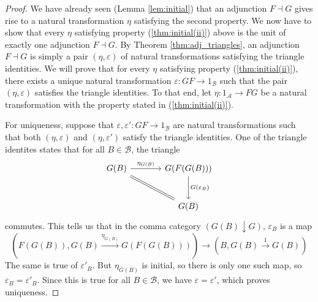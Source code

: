 \documentclass[10pt,oneside]{book}
\def\~#1{\mathscr{#1}}
\def\To#1{\xrightarrow{#1}}
\newcommand{\ve}{\varepsilon}
\theoremstyle{plain}
\theoremstyle{definition}
\theoremstyle{remark}
\numberwithin{equation}{section}
\numberwithin{figure}{section}
\begin{document}
\begin{proof}
    We have already seen (Lemma \ref{lem:initial}) that an adjunction $F \dashv G$ gives rise to a natural transformation $\eta$ satisfying the second property. We now have to show that every $\eta$ satisfying property (\ref{thm:initial(ii)}) above is the unit of exactly one adjunction $F \dashv G$. By Theorem \ref{thm:adj_triangles}, an adjunction $F \dashv G$ is simply a pair $(\eta, \ve)$ of natural transformations satisfying the triangle identities. We will prove that for every $\eta$ satisfying property (\ref{thm:initial(ii)}), there exists a unique natural transformation $\ve: GF \to 1_{\~B}$ such that the pair $(\eta, \ve)$ satisfies the triangle identities. To that end, let $\eta: 1_{\~A} \to FG$ be a natural transformation with the property stated in (\ref{thm:initial(ii)}).

    For uniqueness, suppose that $\ve, \ve': GF \to 1_{\~B}$ are natural transformations such that both $(\eta, \ve)$ and $(\eta, \ve')$ satisfy the triangle identities. One of the triangle identites states that for all $B \in \~B$, the triangle 
    \begin{equation}
    \label{eq:initial_triangle}
    \begin{tikzcd}[column sep = large, row sep = large]
        {G(B)} & {G(F(G(B)))} \\
        & {G(B)}
        \arrow["{\eta_{G(B)}}", from=1-1, to=1-2]
        \arrow["{G(\ve_B)}", from=1-2, to=2-2]
        \arrow[Rightarrow, no head, from=1-1, to=2-2]
    \end{tikzcd}
    \end{equation}
    commutes. This tells us that in the comma category $(G(B) \downarrow G)$, $\ve_B$ is a map 
    \[ \left( F(G(B)), G(B) \To{\eta_{G(B)}} G(F(G(B))) \right) \to \left(B, G(B) \To{1} G(B) \right)\]
    The same is true of $\ve'_B$. But $\eta_{G(B)}$ is initial, so there is only one such map, so $\ve_B = \ve'_B$. Since this is true for all $B \in \~B$, we have $\ve = \ve'$, which proves uniqueness.


\end{proof}
\end{document}
